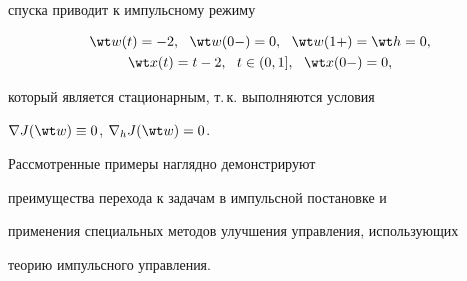 спуска приводит к импульсному режиму


\begin{gather*}


\wt w(t)=-2, \ \ \wt w(0-)=0,\ \ \wt w(1+)=\wt h = 0,\\


\wt x(t) = t-2, \ \ t\in (0,1], \ \ \wt x(0-) = 0,


\end{gather*}


который является стационарным, т.\,к. выполняются условия


$\nabla J(\wt w) \equiv 0$, $\nabla_h J(\wt w)=0$.





Рассмотренные примеры наглядно демонстрируют 


преимущества перехода к задачам в импульсной постановке и 


применения специальных методов улучшения управления, использующих


теорию импульсного управления.








